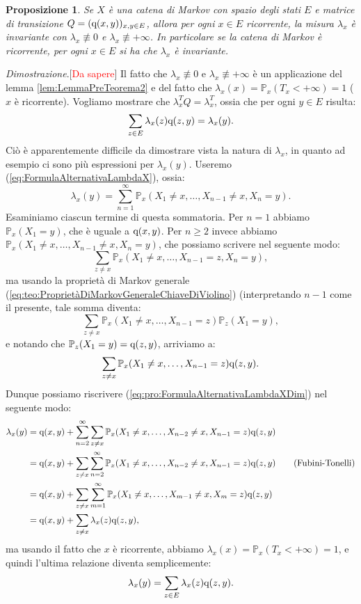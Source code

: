 \documentclass[11pt]{book}
\makeatletter
\theoremstyle{Definizione}
\theoremstyle{TeoremaProposizioneLemmaCorollario}
\newtheorem{mypropo}[myteo]{Proposizione}
\theoremstyle{OsservazioneNota}
\renewenvironment{proof}[1][\proofname]{\par
  \normalfont \topsep6\p@\@plus6\p@\relax
  \trivlist
  \item[\hskip\labelsep
        \itshape
    #1\@addpunct{.}]\ignorespaces
}{%
  \endtrivlist\@endpefalse
}
\renewcommand{\P}{\mathbb{P}}
\newcommand{\q}{\textup{q}}
\renewenvironment{proof}{\textsl{Dimostrazione}.}{}
\makeatother
\begin{document}
\begin{boxpro}
\begin{mypropo}\label{pro:Proposizione1PreTeorema2}
Se $X$ è una catena di Markov con spazio degli stati $E$ e matrice di transizione $Q = (\q(x,y))_{x,y\in E}$, allora per ogni $x\in E$ ricorrente, la misura $\lambda_x$ è invariante con $\lambda_x \not \equiv 0$ e $\lambda_x \not \equiv +\infty$. In particolare se la catena di Markov è ricorrente, per ogni $x\in E$ si ha che $\lambda_x$ è invariante. 
\end{mypropo}
\tcblower
\begin{proof}[\textcolor{red}{Da sapere}]
Il fatto che $\lambda_x \not \equiv 0$ e $\lambda_x \not \equiv +\infty$ è un applicazione del lemma \ref{lem:LemmaPreTeorema2} e del fatto che $\lambda_x(x) = \P_x(T_x < +\infty)  = 1$ ($x$ è ricorrente). Vogliamo mostrare che $\lambda_x^T Q = \lambda_x^T$, ossia che per ogni $y\in E$ risulta:
$$
\sum_{z\in E} \lambda_x(z) \q(z,y) = \lambda_x(y).
$$
Ciò è apparentemente difficile da dimostrare vista la natura di $\lambda_x$, in quanto ad esempio ci sono più espressioni per $\lambda_x(y)$. Useremo (\ref{eq:FormulaAlternativaLambdaX}), ossia:
\begin{equation}\label{eq:pro:FormulaAlternativaLambdaXDim}
\lambda_x(y) = \sum_{n = 1}^\infty \P_x(X_1 \neq x,\dots,X_{n-1}\neq x, X_n = y).
\end{equation}
Esaminiamo ciascun termine di questa sommatoria. Per $n = 1$ abbiamo $\P_x(X_1 = y)$, che è uguale a $\q(x,y)$. Per $n \geq 2$ invece abbiamo $\P_x(X_1\neq x,\dots,X_{n-1} \neq x, X_n = y)$, che possiamo scrivere nel seguente modo:
$$
\sum_{z\neq x} \P_x(X_1 \neq x,\dots,X_{n-1} = z, X_n = y),
$$
ma usando la proprietà di Markov generale (\ref{eq:teo:ProprietàDiMarkovGeneraleChiaveDiViolino}) (interpretando $n-1$ come il presente, tale somma diventa:
$$
\sum_{z\neq x} \P_x(X_1\neq x,\dots, X_{n-1} = z)\P_z(X_1 = y),
$$
e notando che $\P_z(X_1 = y) = \q(z,y)$, arriviamo a:
\begin{equation}\label{eq:pro:ProposizionePreTeorema2EquazioneImportante}
\sum_{z\neq x} \P_x(X_1 \neq x,\dots, X_{n-1} = z)\q(z,y).
\end{equation}
Dunque possiamo riscrivere (\ref{eq:pro:FormulaAlternativaLambdaXDim}) nel seguente modo:
\begin{align}
\lambda_x(y) &= \q(x,y) + \sum_{ n = 2}^\infty \sum_{z \neq x} \P_x(X_1\neq x,\dots, X_{n-2}\neq x, X_{n-1} = z)\q(z,y) \nonumber\\
&= \q(x,y) + \sum_{z\neq x} \sum_{n = 2}^\infty \P_x(X_1\neq x,\dots, X_{n-2}\neq x, X_{n-1} = z)\q(z,y)  \tag*{\textup{(Fubini-Tonelli)}}\\
&= \q(x,y) + \sum_{z \neq x} \sum_{m = 1}^\infty \P_x(X_1 \neq x,\dots,X_{m-1}\neq x, X_m = z)\q(z,y) \nonumber\\
&= \q(x,y) + \sum_{z \neq x} \lambda_x(z)\q(z,y), \nonumber
\end{align}
ma usando il fatto che $x$ è ricorrente, abbiamo $\lambda_x(x) =\P_x(T_x < +\infty) = 1$, e quindi l'ultima relazione diventa semplicemente:
$$
\lambda_x(y) = \sum_{z\in E} \lambda_x(z)\q(z,y).
$$
\end{proof}
\end{boxpro}
\end{document}

